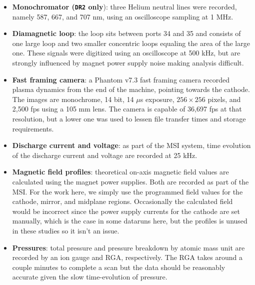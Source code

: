 \begin{itemize}
	\item \textbf{Monochromator (\texttt{DR2} only}): three Helium neutral lines were recorded, namely 587, 667, and 707 nm, using an oscilloscope sampling at 1 MHz.
	\item \textbf{Diamagnetic loop}: the loop sits between ports 34 and 35 and consists of one large loop and two smaller concentric loops equaling the area of the large one. These signals were digitized using an oscilloscope at 500 kHz, but are strongly influenced by magnet power supply noise making analysis difficult.
	\item \textbf{Fast framing camera}: a Phantom v7.3 fast framing camera recorded plasma dynamics from the end of the machine, pointing towards the cathode. The images are monochrome, 14 bit, 14 $\mu$s exposure, $256\times256$ pixels, and 2,500 fps using a 105 mm lens. The camera is capable of 36,697 fps at that resolution, but a lower one was used to lessen file transfer times and storage requirements.
	\item \textbf{Discharge current and voltage}: as part of the MSI system, time evolution of the discharge current and voltage are recorded at 25 kHz.
	\item \textbf{Magnetic field profiles}: theoretical on-axis magnetic field values are calculated using the magnet power supplies. Both are recorded as part of the MSI. For the work here, we simply use the programmed field values for the cathode, mirror, and midplane regions. Occasionally the calculated field would be incorrect since the power supply currents for the cathode are set manually, which is the case in some dataruns here, but the profiles is unused in these studies so it isn't an issue.
	\item \textbf{Pressures}: total pressure and pressure breakdown by atomic mass unit are recorded by an ion gauge and RGA, respectively. The RGA takes around a couple minutes to complete a scan but the data should be reasonably accurate given the slow time-evolution of pressure.
\end{itemize}

